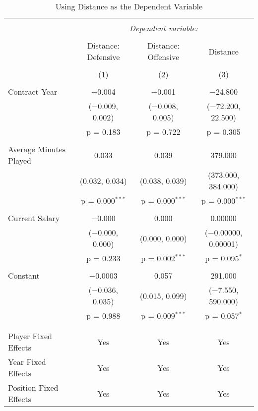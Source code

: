 \documentclass[12pt]{article}
\begin{document}
	\begin{sidewaystable}[!htbp] \centering 
		\caption{Using Distance as the Dependent Variable} 
		\label{} 
		\begin{tabular}{@{\extracolsep{5pt}}lccc} 
			\\[-1.8ex]\hline 
			\hline \\[-1.8ex] 
			& \multicolumn{3}{c}{\textit{Dependent variable:}} \\ 
			\cline{2-4} 
			\\[-1.8ex] & Distance: Defensive & Distance: Offensive & Distance \\ 
			\\[-1.8ex] & (1) & (2) & (3)\\ 
			\hline \\[-1.8ex] 
			Contract Year & $-$0.004 & $-$0.001 & $-$24.800 \\ 
			& ($-$0.009, 0.002) & ($-$0.008, 0.005) & ($-$72.200, 22.500) \\ 
			& p = 0.183 & p = 0.722 & p = 0.305 \\ 
			& & & \\ 
			Average Minutes Played & 0.033 & 0.039 & 379.000 \\ 
			& (0.032, 0.034) & (0.038, 0.039) & (373.000, 384.000) \\ 
			& p = 0.000$^{***}$ & p = 0.000$^{***}$ & p = 0.000$^{***}$ \\ 
			& & & \\ 
			Current Salary & $-$0.000 & 0.000 & 0.00000 \\ 
			& ($-$0.000, 0.000) & (0.000, 0.000) & ($-$0.00000, 0.00001) \\ 
			& p = 0.233 & p = 0.002$^{***}$ & p = 0.095$^{*}$ \\ 
			& & & \\ 
			Constant & $-$0.0003 & 0.057 & 291.000 \\ 
			& ($-$0.036, 0.035) & (0.015, 0.099) & ($-$7.550, 590.000) \\ 
			& p = 0.988 & p = 0.009$^{***}$ & p = 0.057$^{*}$ \\ 
			& & & \\ 
			\hline \\[-1.8ex] 
			Player Fixed Effects & Yes & Yes & Yes \\ 
			Year Fixed Effects & Yes & Yes & Yes \\ 
			Position Fixed Effects & Yes & Yes & Yes \\ 

\end{tabular}
\end{sidewaystable}
\end{document}
